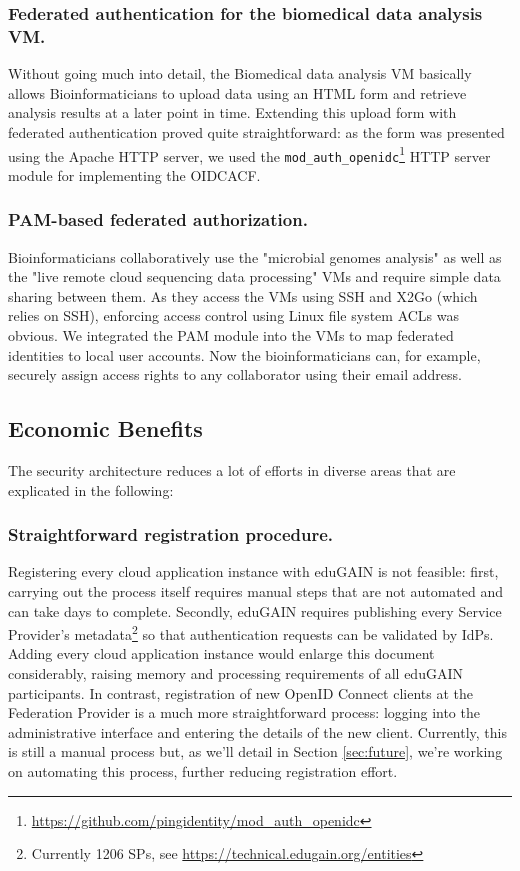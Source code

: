 \documentclass{llncs}
\begin{document}
\subsubsection{Federated authentication for the biomedical data analysis VM.}

Without going much into detail, the Biomedical data analysis VM basically allows Bioinformaticians to upload data using an HTML form and retrieve analysis results at a later point in time. Extending this upload form with federated authentication proved quite straightforward: as the form was presented using the Apache HTTP server, we used the \texttt{mod\_auth\_openidc}\footnote{\url{https://github.com/pingidentity/mod\_auth\_openidc}} HTTP server module for implementing the OIDCACF.

\subsubsection{PAM-based federated authorization.}

Bioinformaticians collaboratively use the "microbial genomes analysis" as well as the "live remote cloud sequencing data processing" VMs and require simple data sharing between them. As they access the VMs using SSH and X2Go (which relies on SSH), enforcing access control using Linux file system ACLs was obvious. We integrated the PAM module into the VMs to map federated identities to local user accounts. Now the bioinformaticians can, for example, securely assign access rights to any collaborator using their email address.

\subsection{Economic Benefits}

The security architecture reduces a lot of efforts in diverse areas that are explicated in the following:

\subsubsection{Straightforward registration procedure.} Registering every cloud application instance with eduGAIN is not feasible: first, carrying out the process itself requires manual steps that are not automated and can take days to complete. Secondly, eduGAIN requires publishing every Service Provider's metadata\footnote{Currently 1206 SPs, see \url{https://technical.edugain.org/entities}} so that authentication requests can be validated by IdPs. Adding every cloud application instance would enlarge this document considerably, raising memory and processing requirements of all eduGAIN participants. In contrast, registration of new OpenID Connect clients at the Federation Provider is a much more straightforward process: logging into the administrative interface and entering the details of the new client. Currently, this is still a manual process but, as we'll detail in Section \ref{sec:future}, we're working on automating this process, further reducing registration effort.
\end{document}
